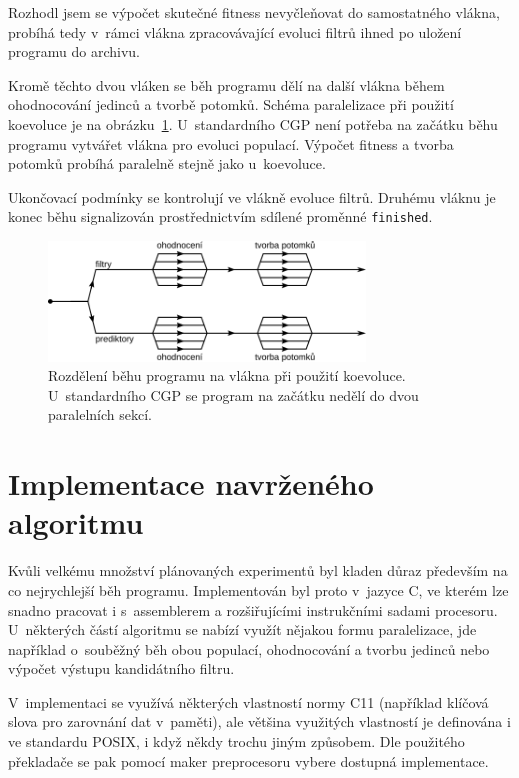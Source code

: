 Rozhodl jsem se výpočet skutečné fitness nevyčleňovat do samostatného vlákna, probíhá tedy v~rámci vlákna zpracovávající evoluci filtrů ihned po uložení programu do archivu.

Kromě těchto dvou vláken se běh programu dělí na další vlákna během ohodnocování jedinců a tvorbě potomků. Schéma paralelizace při použití koevoluce je na obrázku~\ref{obrParalelizace}. U~standardního CGP není potřeba na začátku běhu programu vytvářet vlákna pro evoluci populací. Výpočet fitness a tvorba potomků probíhá paralelně stejně jako u~koevoluce.

Ukončovací podmínky se kontrolují ve vlákně evoluce filtrů. Druhému vláknu je konec běhu signalizován prostřednictvím sdílené proměnné \texttt{finished}.

\begin{figure}[htb]
    \centering
    \includegraphics[width=0.75\textwidth]{fig/openmp}
    \caption{Rozdělení běhu programu na vlákna při použití koevoluce. U~standardního CGP se program na začátku nedělí do dvou paralelních sekcí.}
    \label{obrParalelizace}
\end{figure}


\chapter{Implementace navrženého algoritmu}
\label{chImplementation}

Kvůli velkému množství plánovaných experimentů byl kladen důraz především na co nejrychlejší běh programu. Implementován byl proto v~jazyce C, ve kterém lze snadno pracovat i s~assemblerem a rozšiřujícími instrukčními sadami procesoru. U~některých částí algoritmu se nabízí využít nějakou formu paralelizace, jde například o~souběžný běh obou populací, ohodnocování a tvorbu jedinců nebo výpočet výstupu kandidátního filtru.

V~implementaci se využívá některých vlastností normy C11 (například klíčová slova pro zarovnání dat v~paměti), ale většina využitých vlastností je definována i ve standardu POSIX, i když někdy trochu jiným způsobem. Dle použitého překladače se pak pomocí maker preprocesoru vybere dostupná implementace.

